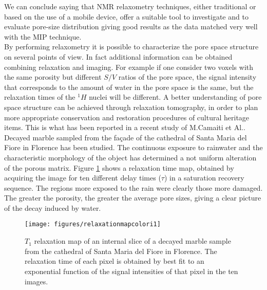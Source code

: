 \documentclass[a4paper,11pt]{report}
\begin{document}
 We can conclude saying that NMR relaxometry techniques, either traditional or based on the use of a mobile device, offer a suitable tool to investigate and to evaluate pore-size distribution giving good results as the data matched very well with the MIP technique\cite{due}.\\
By performing relaxometry it is possible to characterize the pore space structure on several points of view. In fact additional information can be obtained combining relaxation and imaging. For example if one consider two voxels with the same porosity but different $S/V$ ratios of the pore space, the signal intensity that corresponds to the amount of water in the pore space is the same, but the relaxation times of the $^1H$ nuclei will be different. A better understanding of pore space structure can be achieved through relaxation tomography, in order to plan more appropriate conservation and restoration procedures of cultural heritage items. This is what has been reported in a recent study of M.Camaiti et Al.\cite{quattro}. Decayed marble sampled from the façade of the cathedral of Santa Maria del Fiore in Florence has been studied. The continuous exposure to rainwater and the characteristic morphology of the object has determined a not uniform alteration of the porous matrix. Figure \ref{relaxationmap} shows a relaxation time map, obtained by acquiring the image for ten different delay times ($\tau$) in a saturation recovery sequence. The regions more exposed to the rain were clearly those more damaged. The greater the porosity, the greater the average pore sizes, giving a clear picture of the decay induced by water.
\begin{figure}[h]

\centering
\texttt{[image: figures/relaxationmapcolori1]}
\caption{$T_1$ relaxation map of an internal slice of a decayed marble sample from the cathedral of Santa Maria del Fiore in Florence. The relaxation time of each pixel is obtained by best fit to an exponential function of the signal intensities of that pixel in the ten images.}\label{relaxationmap}
\end{figure}
\end{document}
